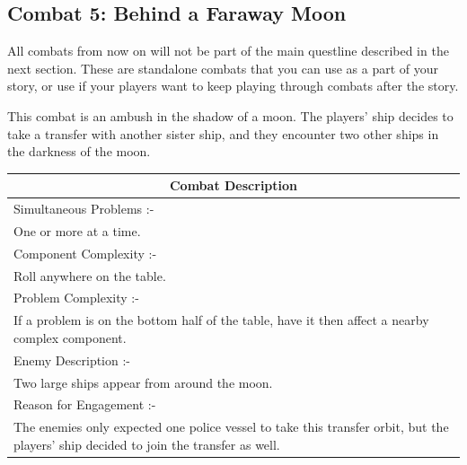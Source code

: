 \documentclass[a4paper]{article}
\begin{document}
\newpage
\subsection{Combat 5: Behind a Faraway Moon} \label{combat_5}

All combats from now on will not be part of the main questline described in the next section. These are standalone combats that you can use as a part of your story, or use if your players want to keep playing through combats after the story.

This combat is an ambush in the shadow of a moon. The players' ship decides to take a transfer with another sister ship, and they encounter two other ships in the darkness of the moon.

\begin{minipage}[t]{0.5\linewidth}
\begin{tabular}[t]{| p{7cm} |}
\toprule
\multicolumn{1}{|c|}{Combat Description} \\
\midrule
Simultaneous Problems :- \\
One or more at a time. \\	
\midrule
Component Complexity :- \\
Roll anywhere on the table. \\
\midrule
Problem Complexity :- \\
If a problem is on the bottom half of the table, have it then affect a nearby complex component. \\
\midrule
Enemy Description :- \\
Two large ships appear from around the moon. \\
\midrule
Reason for Engagement :- \\
The enemies only expected one police vessel to take this transfer orbit, but the players' ship decided to join the transfer as well. \\
\bottomrule
\end{tabular}
\end{minipage}
\end{document}
